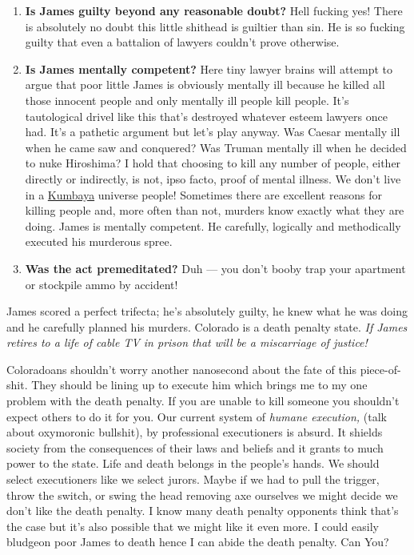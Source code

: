 \begin{enumerate}
\item
  \textbf{Is James guilty beyond any reasonable doubt?} Hell fucking yes!
  There is absolutely no doubt this little shithead is guiltier than
  sin. He is so fucking guilty that even a battalion of lawyers couldn't
  prove otherwise.
\item
  \textbf{Is James mentally competent?} Here tiny lawyer brains will
  attempt to argue that poor little James is obviously mentally ill
  because he killed all those innocent people and only mentally ill
  people kill people. It's tautological drivel like this that's
  destroyed whatever esteem lawyers once had. It's a pathetic argument
  but let's play anyway. Was Caesar mentally ill when he came saw and
  conquered? Was Truman mentally ill when he decided to nuke Hiroshima?
  I hold that choosing to kill any number of people, either directly or
  indirectly, is not, ipso facto, proof of mental illness. We don't live
  in a
  \href{http://www.thespoof.com/news/spoof.cfm?headline=s2i89689}{Kumbaya} universe
  people! Sometimes there are excellent reasons for killing people and,
  more often than not, murders know exactly what they are doing.
  James is mentally competent. He carefully, logically and
  methodically executed his murderous spree.
\item
  \textbf{Was the act premeditated?} Duh --- you don't booby trap your
  apartment or stockpile ammo by accident!
\end{enumerate}
James scored a perfect trifecta; he's absolutely guilty, he knew what he
was doing and he carefully planned his murders. Colorado is a death
penalty state. \emph{If James retires to a life of cable TV in prison
that will be a miscarriage of justice!}


Coloradoans shouldn't worry another nanosecond about the fate of this
piece-of-shit. They should be lining up to execute him which brings me
to my one problem with the death penalty. If you are unable to kill
someone you shouldn't expect others to do it for you. Our
current system of \emph{humane execution,} (talk about oxymoronic
bullshit), by professional executioners is absurd. It shields society
from the consequences of their laws and beliefs and it grants to much
power to the state. Life and death belongs in the people's hands. We
should select executioners like we select jurors. Maybe if we had to
pull the trigger, throw the switch, or swing the head removing axe
ourselves we might decide we don't like the death penalty. I know many
death penalty opponents think that's the case but it's also possible
that we might like it even more. I could easily bludgeon poor James to
death hence I can abide the death
penalty. Can You?




%